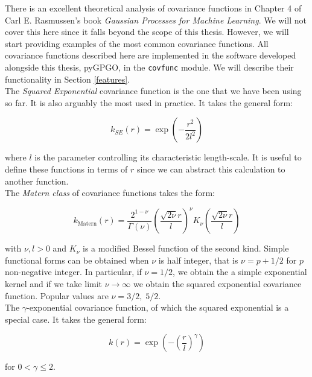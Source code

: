\documentclass[10pt,a4paper,twoside]{book}
\begin{document}
There is an excellent theoretical analysis of covariance functions in Chapter 4 of Carl E. Rasmussen's book \textit{Gaussian Processes for Machine Learning}. We will not cover this here since it falls beyond the scope of this thesis. However, we will start providing examples of the most common covariance functions. All covariance functions described here are implemented in the software developed alongside this thesis, pyGPGO, in the \texttt{covfunc} module. We will describe their functionality in Section \ref{features}.\\

The \textit{Squared Exponential} covariance function is the one that we have been using so far. It is also arguably the most used in practice. It takes the general form:

\begin{equation}
k_{SE}(r) = \exp\left(-\dfrac{r^2}{2l^2} \right)
\end{equation}

where $l$ is the parameter controlling its characteristic length-scale. It is useful to define these functions in terms of $r$ since we can abstract this calculation to another function. \\

The \textit{Matern class} of covariance functions takes the form:

\begin{equation}
k_{\textrm{Matern}}(r) = \dfrac{2^{1-\nu}}{\Gamma(\nu)}\left(\dfrac{\sqrt{2\nu} r}{l}    \right)^\nu K_\nu\left( \dfrac{\sqrt{2\nu}r}{l} \right)
\end{equation}

with $\nu, l > 0$ and $K_\nu$ is a modified Bessel function of the second kind.  Simple functional forms can be obtained when $\nu$ is half integer, that is $\nu = p + 1/2$ for $p$ non-negative integer. In particular, if $\nu=1/2$, we obtain the a simple exponential kernel and if we take limit $\nu \rightarrow \infty$ we obtain the squared exponential covariance function. Popular values are $\nu=3/2,\; 5/2$.\\


The $\gamma$-exponential covariance function, of which the squared exponential is a special case. It takes the general form:

\begin{equation}
k(r) = \exp\left( - \left(\dfrac{r}{l}\right)^\gamma  \right)
\end{equation}

for $0 < \gamma \leq 2$. \\
\end{document}
